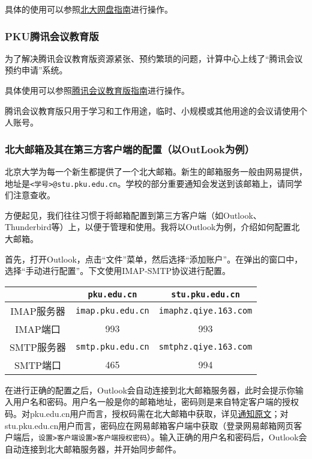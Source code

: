 具体的使用可以参照\href{https://its.pku.edu.cn/service_1_webdisk.jsp}{北大网盘指南}进行操作。

\subsubsection{PKU腾讯会议教育版}

为了解决腾讯会议教育版资源紧张、预约繁琐的问题，计算中心上线了“腾讯会议预约申请”系统。

具体使用可以参照\href{https://its.pku.edu.cn/service_1_webex.jsp}{腾讯会议教育版指南}进行操作。

\begin{warning}
  腾讯会议教育版只用于学习和工作用途，临时、小规模或其他用途的会议请使用个人账号。
\end{warning}

\subsubsection{北大邮箱及其在第三方客户端的配置（以OutLook为例）}

北京大学为每一个新生都提供了一个北大邮箱。新生的邮箱服务一般由网易提供，地址是\texttt{<学号>@stu.pku.edu.cn}。学校的部分重要通知会发送到该邮箱上，请同学们注意查收。

方便起见，我们往往习惯于将邮箱配置到第三方客户端（如Outlook、Thunderbird等）上，以便于管理和使用。我将以Outlook为例，介绍如何配置北大邮箱。

首先，打开Outlook，点击“文件”菜单，然后选择“添加账户”。在弹出的窗口中，选择“手动进行配置”。下文使用IMAP-SMTP协议进行配置。

\begin{table}[ht]
  \centering
  \begin{tabular}{c|c|c}
    \hline
    & \texttt{pku.edu.cn} & \texttt{stu.pku.edu.cn} \\
    \hline
    IMAP服务器 & \texttt{imap.pku.edu.cn} & \texttt{imaphz.qiye.163.com} \\
    IMAP端口 & 993 & 993 \\
    \hline
    SMTP服务器 & \texttt{smtp.pku.edu.cn} & \texttt{smtphz.qiye.163.com} \\
    SMTP端口 & 465 & 994 \\
    \hline
  \end{tabular}
\end{table}

在进行正确的配置之后，Outlook会自动连接到北大邮箱服务器，此时会提示你输入用户名和密码。用户名一般是你的邮箱地址，密码则是来自特定客户端的授权码。对pku.edu.cn用户而言，授权码需在北大邮箱中获取，详见\href{https://its.pku.edu.cn/announce/tz20250702100126.jsp}{通知原文}；对stu.pku.edu.cn用户而言，密码应在网易邮箱客户端中获取（登录网易邮箱网页客户端后，\texttt{设置>客户端设置>客户端授权密码}）。输入正确的用户名和密码后，Outlook会自动连接到北大邮箱服务器，并开始同步邮件。

